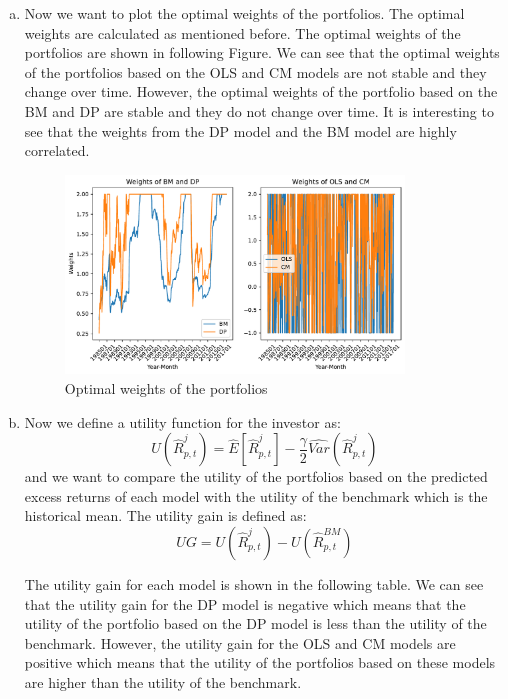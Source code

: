 \begin{enumerate}[(a)]
    \item Now we want to plot the optimal weights of the portfolios. The optimal weights are calculated as mentioned before. The optimal weights of the portfolios are shown in following Figure. We can see that the optimal weights of the portfolios based on the OLS and CM models are not stable and they change over time. However, the optimal weights of the portfolio based on the BM and DP  are stable and they do not change over time. It is interesting to see that the weights from the DP model and the BM model are highly correlated. 
    \begin{figure}[htbp!]
        \centering
        \includegraphics[width=0.85\textwidth]{Out/Ex4_D.pdf}
        \caption{Optimal weights of the portfolios}
    \end{figure}

    \item Now we define a utility function for the investor as:
    \begin{equation*}
        U(\hat{R}_{p,t}^j) = \hat{E}\left[\hat{R}_{p,t}^j\right] - \frac{\gamma}{2} \hat{Var}\left(\hat{R}_{p,t}^j\right)
    \end{equation*}
    and we want to compare the utility of the portfolios based on the predicted excess returns of each model with the utility of the benchmark which is the historical mean. The utility gain is defined as:
    \begin{equation*}
        UG = U(\hat{R}_{p,t}^j) - U(\hat{R}_{p,t}^{BM})
    \end{equation*}
    
    The utility gain for each model is shown in the following table. We can see that the utility gain for the DP model is negative which means that the utility of the portfolio based on the DP model is less than the utility of the benchmark. However, the utility gain for the OLS and CM models are positive which means that the utility of the portfolios based on these models are higher than the utility of the benchmark.


\end{enumerate}
